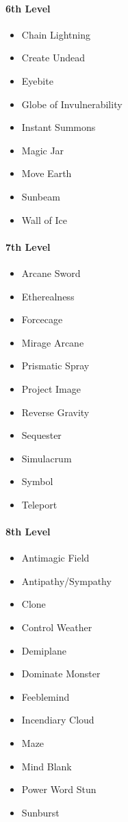 \paragraph{6th Level}\label{_6th_level_2}

\begin{itemize}
\item
  Chain Lightning
\item
  Create Undead
\item
  Eyebite
\item
  Globe of Invulnerability
\item
  Instant Summons
\item
  Magic Jar
\item
  Move Earth
\item
  Sunbeam
\item
  Wall of Ice
\end{itemize}

\paragraph{7th Level}\label{_7th_level_2}

\begin{itemize}
\item
  Arcane Sword
\item
  Etherealness
\item
  Forcecage
\item
  Mirage Arcane
\item
  Prismatic Spray
\item
  Project Image
\item
  Reverse Gravity
\item
  Sequester
\item
  Simulacrum
\item
  Symbol
\item
  Teleport
\end{itemize}

\paragraph{8th Level}\label{_8th_level_2}

\begin{itemize}
\item
  Antimagic Field
\item
  Antipathy/Sympathy
\item
  Clone
\item
  Control Weather
\item
  Demiplane
\item
  Dominate Monster
\item
  Feeblemind
\item
  Incendiary Cloud
\item
  Maze
\item
  Mind Blank
\item
  Power Word Stun
\item
  Sunburst
\end{itemize}

